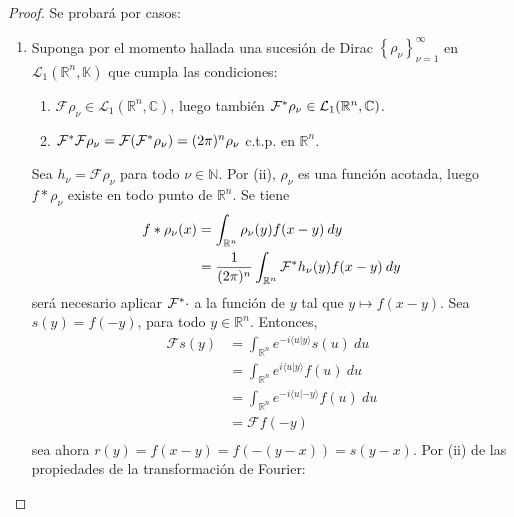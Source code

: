 \documentclass[12pt]{report}
\theoremstyle{largebreak}
\newcommand\pint[2]{\ensuremath{\langle#1| #2\rangle}}
\newcommand{\fou}[1]{\ensuremath{\mathcal{F}#1}}
\begin{document}
    \begin{proof}
        Se probará por casos:
        \begin{enumerate}
            \item Suponga por el momento hallada una sucesión de Dirac $\left\{\rho_\nu\right\}_{\nu=1}^\infty$ en $\mathcal{L}_1(\mathbb{R}^n,\mathbb{K})$ que cumpla las condiciones:
            \begin{enumerate}
                \item $\fou{\rho_\nu}\in\mathcal{L}_1(\mathbb{R}^n,\mathbb{C})$, luego también $\fou^*{\rho_\nu}\in\mathcal{L}_1(\mathbb{R}^n,\mathbb{C})$.
                \item $\fou^*{\fou{\rho_\nu}}=\fou{(\fou^*{\rho_\nu})}=(2\pi)^n\rho_\nu$ c.t.p. en $\mathbb{R}^n$.
            \end{enumerate}
            Sea $h_\nu=\fou{\rho_\nu}$ para todo $\nu\in\mathbb{N}$. Por (ii), $\rho_\nu$ es una función acotada, luego $f*\rho_\nu$ existe en todo punto de $\mathbb{R}^n$. Se tiene
            \begin{equation*}
                \begin{split}
                    f*\rho_\nu(x)&=\int_{\mathbb{R}^n}\rho_\nu(y)f(x-y)\:dy\\
                    &=\frac{1}{(2\pi)^n}\int_{\mathbb{R}^n}\fou^*{h_\nu}(y)f(x-y)\:dy\\
                \end{split}
            \end{equation*}
            será necesario aplicar $\fou^*{\cdot}$ a la función de $y$ tal que $y\mapsto f(x-y)$. Sea $s(y)=f(-y)$, para todo $y\in\mathbb{R}^n$. Entonces,
            \begin{equation*}
                \begin{split}
                    \fou{s}(y)&=\int_{\mathbb{R}^n}e^{ -i\pint{u}{y}}s(u)\:du\\
                    &=\int_{\mathbb{R}^n}e^{i\pint{u}{y}}f(u)\:du\\
                    &=\int_{\mathbb{R}^n}e^{-i\pint{u}{-y}}f(u)\:du\\
                    &=\fou{f}(-y)\\
                \end{split}
            \end{equation*}
            sea ahora $r(y)=f(x-y)=f(-(y-x))=s(y-x)$. Por (ii) de las propiedades de la transformación de Fourier:
            \begin{equation*}

\end{equation*}
\end{enumerate}
\end{proof}
\end{document}
